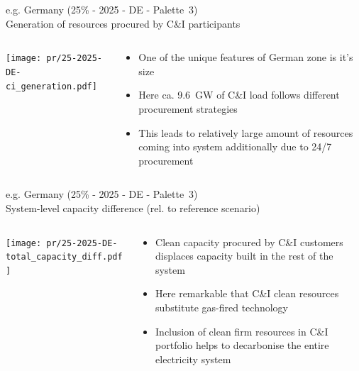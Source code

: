 \begin{frame}{e.g. Germany (25\% - 2025 - DE - Palette~3) 
\\ Generation of resources procured by C\&I participants}

\begin{columns}[T]
\begin{column}{9cm}
\centering

\texttt{[image: pr/25-2025-DE-ci\_generation.pdf]}
\end{column}
\begin{column}{5cm}

  \begin{itemize}
  \item  One of the unique features of German zone is it's size
  \item Here ca. \alert{9.6~GW} of C\&I load follows different procurement strategies
  \item This leads to relatively \alert{large amount of resources coming into system additionally} due to 24/7 procurement
  \end{itemize}
  
\end{column}
\end{columns}

\end{frame}



\begin{frame}{e.g. Germany (25\% - 2025 - DE - Palette~3) 
\\ System-level capacity difference (rel. to reference scenario)}

\begin{columns}[T]
\begin{column}{9cm}
\centering

\texttt{[image: pr/25-2025-DE-total\_capacity\_diff.pdf]}
\end{column}
\begin{column}{5cm}

  \begin{itemize}
  \item  Clean capacity procured by C\&I customers displaces capacity built in the rest of the system 
  \item Here remarkable that \alert{C\&I clean resources substitute gas-fired technology}
  \item Inclusion of clean firm resources in C\&I portfolio \alert{helps to decarbonise} the entire electricity system
  \end{itemize}
  
\end{column}
\end{columns}

\end{frame}



